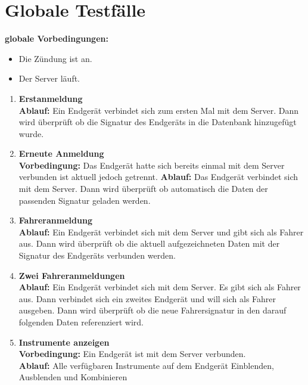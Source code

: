 \documentclass[pflichtenheft.tex]{subfiles}
\begin{document}
\chapter{Globale Testfälle}

\renewcommand{\theenumi}{/GT\ifnum \value{enumi}<10 0\fi\arabic{enumi}0/}
\renewcommand{\labelenumi}{\theenumi}
\renewcommand{\theenumii}{\arabic{enumii}}
\renewcommand{\labelenumii}{GT\ifnum \value{enumi}<10 0\fi\arabic{enumi}\arabic{enumii}/}

\textbf{globale Vorbedingungen:}
\begin{itemize}
\item
Die Zündung ist an.
\item
Der Server läuft.
\end{itemize}

\begin{enumerate}

\item{\textbf{Erstanmeldung}} \\
\textbf{Ablauf: } Ein Endgerät verbindet sich zum ersten Mal mit dem Server. Dann wird überprüft ob die Signatur des Endgeräts in die Datenbank hinzugefügt wurde.

\item{\textbf{Erneute Anmeldung}} \\
\textbf{Vorbedingung: } Das Endgerät hatte sich bereits einmal mit dem Server verbunden ist aktuell jedoch getrennt.
\textbf{Ablauf: } Das Endgerät verbindet sich mit dem Server. Dann wird überprüft ob automatisch die Daten der passenden Signatur geladen werden.

\item{\textbf{Fahreranmeldung}} \\
\textbf{Ablauf: } Ein Endgerät verbindet sich mit dem Server und gibt sich als Fahrer aus. Dann wird überprüft ob die aktuell aufgezeichneten Daten mit der Signatur des Endgeräts verbunden werden.

\item{\textbf{Zwei Fahreranmeldungen}} \\
\textbf{Ablauf: } Ein Endgerät verbindet sich mit dem Server. Es gibt sich als Fahrer aus. Dann verbindet sich ein zweites Endgerät und will sich als Fahrer ausgeben. Dann wird überprüft ob die neue Fahrersignatur in den darauf folgenden Daten referenziert wird.


\item{\textbf{Instrumente anzeigen}} \\
\textbf{Vorbedingung: } Ein Endgerät ist mit dem Server verbunden. \\
\textbf{Ablauf: } Alle verfügbaren Instrumente auf dem Endgerät Einblenden, Ausblenden und Kombinieren


\end{enumerate}
\end{document}
